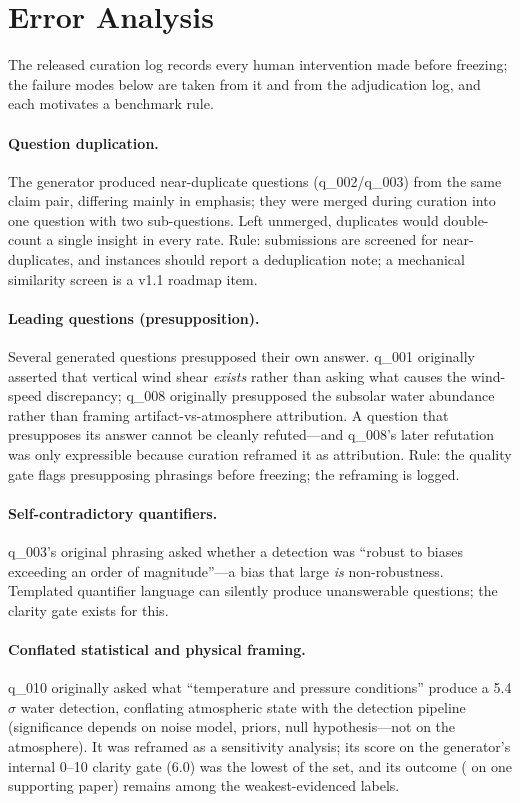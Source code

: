 \section{Error Analysis}
\label{sec:errors}

The released curation log records every human intervention made before
freezing; the failure modes below are taken from it and from the
adjudication log, and each motivates a benchmark rule.

\paragraph{Question duplication.} The generator produced near-duplicate
questions (q\_002/q\_003) from the same claim pair, differing mainly in
emphasis; they were merged during curation into one question with two
sub-questions. Left unmerged, duplicates would double-count a single
insight in every rate. Rule: submissions are screened for
near-duplicates, and instances should report a deduplication note; a
mechanical similarity screen is a v1.1 roadmap item.

\paragraph{Leading questions (presupposition).} Several generated
questions presupposed their own answer. q\_001 originally asserted that
vertical wind shear \emph{exists} rather than asking what causes the
wind-speed discrepancy; q\_008 originally presupposed the subsolar water
abundance rather than framing artifact-vs-atmosphere attribution. A
question that presupposes its answer cannot be cleanly refuted---and
q\_008's later refutation was only expressible because curation reframed
it as attribution. Rule: the quality gate flags presupposing phrasings
before freezing; the reframing is logged.

\paragraph{Self-contradictory quantifiers.} q\_003's original phrasing
asked whether a detection was ``robust to biases exceeding an order of
magnitude''---a bias that large \emph{is} non-robustness. Templated
quantifier language can silently produce unanswerable questions; the
clarity gate exists for this.

\paragraph{Conflated statistical and physical framing.} q\_010
originally asked what ``temperature and pressure conditions'' produce a
5.4$\sigma$ water detection, conflating atmospheric state with the
detection pipeline (significance depends on noise model, priors, null
hypothesis---not on the atmosphere). It was reframed as a sensitivity
analysis; its score on the generator's internal 0--10 clarity gate
(6.0) was the lowest of the set, and
its outcome ( on one supporting paper)
remains among the weakest-evidenced labels.

